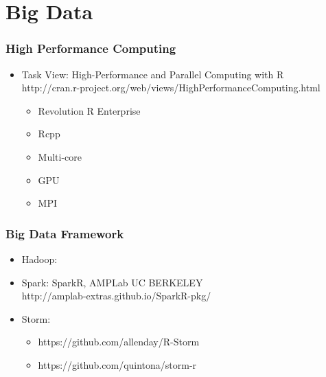 \documentclass[UTF8]{beamer}\usepackage[]{graphicx}\usepackage[]{color}
\begin{document}
\section{Big Data}
\begin{frame}
  \frametitle{High Performance Computing}
  \begin{itemize}
    \item Task View: High-Performance and Parallel Computing with R\\
    http://cran.r-project.org/web/views/HighPerformanceComputing.html
    \begin{itemize}
      \item Revolution R Enterprise
      \item Rcpp
      \item Multi-core
      \item GPU
      \item MPI
    \end{itemize}
  \end{itemize}
\end{frame}

\begin{frame}
  \frametitle{Big Data Framework}
  \begin{itemize}
    \item Hadoop:
    \item Spark: SparkR, AMPLab UC BERKELEY\\
    http://amplab-extras.github.io/SparkR-pkg/
    \item Storm:
    \begin{itemize}
      \item https://github.com/allenday/R-Storm
      \item https://github.com/quintona/storm-r
    \end{itemize}
  \end{itemize}
\end{frame}
\end{document}
